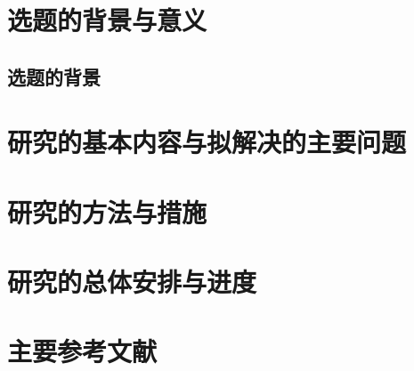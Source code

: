 \section{选题的背景与意义}

\subsection{选题的背景}


\lipsum[1]

\section{研究的基本内容与拟解决的主要问题}

\lipsum[2-4]

\section{研究的方法与措施}

\lipsum[5-7]

\section{研究的总体安排与进度}

\lipsum[8-11]

\section{主要参考文献}